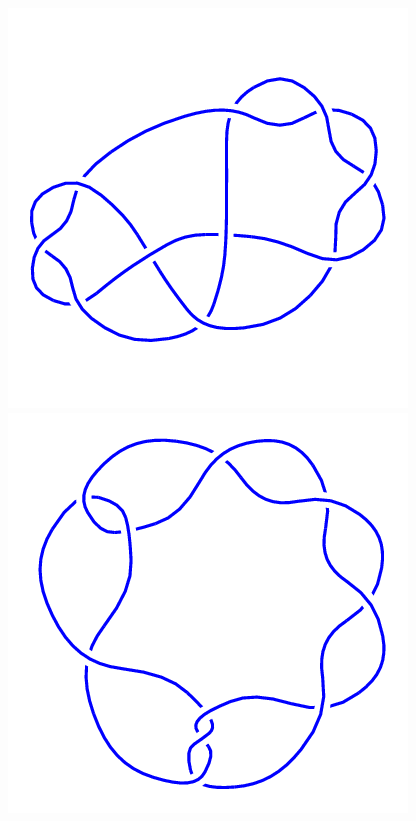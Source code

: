 \begin{figure}[H]
\begin{minipage}[b]{.18\linewidth}
    \end{minipage}
    \begin{minipage}[b]{.18\linewidth}
        \centering
        \includegraphics[width=\linewidth]{../data/10_19.png}
    \end{minipage}
    \begin{minipage}[b]{.18\linewidth}
        \centering
        \includegraphics[width=\linewidth]{../data/10_20.png}

\end{minipage}
\end{figure}
